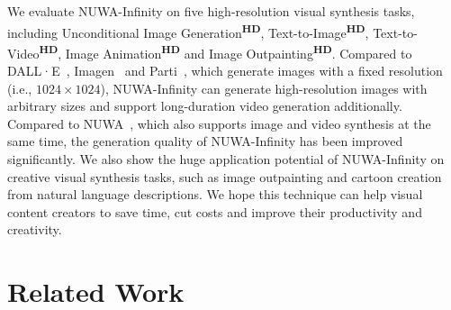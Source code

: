 \documentclass{article}
\begin{document}
We evaluate NUWA-Infinity on five high-resolution visual synthesis tasks, including Unconditional Image Generation\textsuperscript{\textbf{HD}}, Text-to-Image\textsuperscript{\textbf{HD}}, Text-to-Video\textsuperscript{\textbf{HD}}, Image Animation\textsuperscript{\textbf{HD}} and Image Outpainting\textsuperscript{\textbf{HD}}. Compared to DALL·E~\cite{rameshZeroShotTexttoImageGeneration2021}, Imagen~\cite{sahariaPhotorealisticTexttoImageDiffusion2022} and Parti~\cite{yuScalingAutoregressiveModels2022}, which generate images with a fixed resolution (i.e., $1024\times1024$), NUWA-Infinity can generate high-resolution images with arbitrary sizes and support long-duration video generation additionally. Compared to NUWA~\cite{wuUWAVisualSynthesis2022}, which also supports image and video synthesis at the same time, the generation quality of NUWA-Infinity has been improved significantly. We also show the huge application potential of NUWA-Infinity on creative visual synthesis tasks, such as image outpainting and cartoon creation from natural language descriptions. We hope this technique can help visual content creators to save time, cut costs and improve their productivity and creativity.








































\section{Related Work}\label{sec:relatedwork}
\vspace{-2mm}
\end{document}
